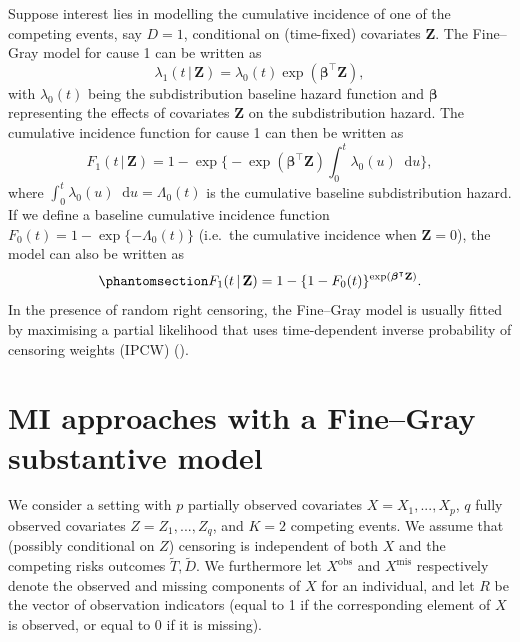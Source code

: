 \documentclass[
  letterpaper,
  paper=240mm:170mm,
  twoside=true,
  open=right,
  fontsize=10pt,
  pagesize=false,
  BCOR=15mm,
  DIV=14,
  headinclude=true,
  footinclude=false,
  headsepline=on]{scrbook}
\newcommand{\given}{\,|\,}
\newcommand\diff{\mathop{}\!\mathrm{d}}
\begin{document}
Suppose interest lies in modelling the cumulative incidence of one of
the competing events, say \(D = 1\), conditional on (time-fixed)
covariates \(\mathbf{Z}\). The Fine--Gray model for cause 1 can be
written as \begin{equation*}
    \lambda_1(t \given \mathbf{Z}) = \lambda_{0}(t)\exp(\boldsymbol{\beta}^\intercal \mathbf{Z}),
\end{equation*} with \(\lambda_{0}(t)\) being the subdistribution
baseline hazard function and \(\boldsymbol{\beta}\) representing the
effects of covariates \(\mathbf{Z}\) on the subdistribution hazard. The
cumulative incidence function for cause 1 can then be written as
\begin{equation*}
    F_1(t \given \mathbf{Z}) = 1 - \exp \Biggl\{ -\exp(\boldsymbol{\beta}^\intercal \mathbf{Z}) \int_{0}^{t} \lambda_{0}(u)\diff u \Biggr\},
\end{equation*} where
\(\int_{0}^{t} \lambda_{0}(u)\diff u = \Lambda_0(t)\) is the cumulative
baseline subdistribution hazard. If we define a baseline cumulative
incidence function \(F_{0}(t) = 1 - \exp\{-\Lambda_0(t)\}\) (i.e.~the
cumulative incidence when \(\mathbf{Z} = 0\)), the model can also be
written as \begin{equation}\phantomsection\label{eq-cuminc-comp}{
F_1(t \given \mathbf{Z}) = 1 - \{1 - F_{0}(t)\}^{\exp(\boldsymbol{\beta}^\intercal \mathbf{Z})}.
}\end{equation} In the presence of random right censoring, the
Fine--Gray model is usually fitted by maximising a partial likelihood
that uses time-dependent inverse probability of censoring weights (IPCW)
().

\section{MI approaches with a Fine--Gray substantive
model}\label{sec-methods}

We consider a setting with \(p\) partially observed covariates
\(X = X_1,...,X_p\), \(q\) fully observed covariates
\(Z = Z_1,...,Z_q\), and \(K = 2\) competing events. We assume that
(possibly conditional on \(Z\)) censoring is independent of both \(X\)
and the competing risks outcomes \(\tilde{T}, \tilde{D}\). We
furthermore let \(X^{\text{obs}}\) and \(X^{\text{mis}}\) respectively
denote the observed and missing components of \(X\) for an individual,
and let \(R\) be the vector of observation indicators (equal to 1 if the
corresponding element of \(X\) is observed, or equal to 0 if it is
missing).
\end{document}
